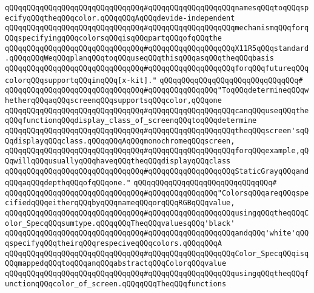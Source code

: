 \verb|qQQqqQQqqQQqqQQqqQQqqQQqqQQqqQQq#qQQqqQQqqQQqqQQqqQQqnamesqQQqtoqQQqspecifyqQQqtheqQQqcolor.qQQqqQQqAqQQqdevide-independent|\newline
\verb|qQQqqQQqqQQqqQQqqQQqqQQqqQQqqQQq#qQQqqQQqqQQqqQQqqQQqmechanismqQQqforqQQqspecifyingqQQqcolorsqQQqisqQQqpartqQQqofqQQqthe|\newline
\verb|qQQqqQQqqQQqqQQqqQQqqQQqqQQqqQQq#qQQqqQQqqQQqqQQqqQQqX11R5qQQqstandard.qQQqqQQqWeqQQqplanqQQqtoqQQquseqQQqthisqQQqasqQQqtheqQQqbasis|\newline
\verb|qQQqqQQqqQQqqQQqqQQqqQQqqQQqqQQq#qQQqqQQqqQQqqQQqqQQqforqQQqfutureqQQqcolorqQQqsupportqQQqinqQQq[x-kit]."|\newline
\verb|qQQqqQQqqQQqqQQqqQQqqQQqqQQqqQQq#|\newline
\verb|qQQqqQQqqQQqqQQqqQQqqQQqqQQqqQQq#qQQqqQQqqQQqqQQq"ToqQQqdetermineqQQqwhetherqQQqaqQQqscreenqQQqsupportsqQQqcolor,qQQqone|\newline
\verb|qQQqqQQqqQQqqQQqqQQqqQQqqQQqqQQq#qQQqqQQqqQQqqQQqqQQqcanqQQquseqQQqtheqQQqfunctionqQQqdisplay_class_of_screenqQQqtoqQQqdetermine|\newline
\verb|qQQqqQQqqQQqqQQqqQQqqQQqqQQqqQQq#qQQqqQQqqQQqqQQqqQQqtheqQQqscreen'sqQQqdisplayqQQqclass.qQQqqQQqAqQQqmonochromeqQQqscreen,|\newline
\verb|qQQqqQQqqQQqqQQqqQQqqQQqqQQqqQQq#qQQqqQQqqQQqqQQqqQQqforqQQqexample,qQQqwillqQQqusuallyqQQqhaveqQQqtheqQQqdisplayqQQqclass|\newline
\verb|qQQqqQQqqQQqqQQqqQQqqQQqqQQqqQQq#qQQqqQQqqQQqqQQqqQQqStaticGrayqQQqandqQQqaqQQqdepthqQQqofqQQqone."|\newline
\verb|qQQqqQQqqQQqqQQqqQQqqQQqqQQqqQQq#|\newline
\verb|qQQqqQQqqQQqqQQqqQQqqQQqqQQqqQQq#qQQqqQQqqQQqqQQq"ColorsqQQqareqQQqspecifiedqQQqeitherqQQqbyqQQqnameqQQqorqQQqRGBqQQqvalue,|\newline
\verb|qQQqqQQqqQQqqQQqqQQqqQQqqQQqqQQq#qQQqqQQqqQQqqQQqqQQqusingqQQqtheqQQqColor_SpecqQQqsumtype.qQQqqQQqTheqQQqvaluesqQQq'black'|\newline
\verb|qQQqqQQqqQQqqQQqqQQqqQQqqQQqqQQq#qQQqqQQqqQQqqQQqqQQqandqQQq'white'qQQqspecifyqQQqtheirqQQqrespeciveqQQqcolors.qQQqqQQqA|\newline
\verb|qQQqqQQqqQQqqQQqqQQqqQQqqQQqqQQq#qQQqqQQqqQQqqQQqqQQqColor_SpecqQQqisqQQqmappedqQQqtoqQQqanqQQqabstractqQQqColorqQQqvalue|\newline
\verb|qQQqqQQqqQQqqQQqqQQqqQQqqQQqqQQq#qQQqqQQqqQQqqQQqqQQqusingqQQqtheqQQqfunctionqQQqcolor_of_screen.qQQqqQQqTheqQQqfunctions|\newline
